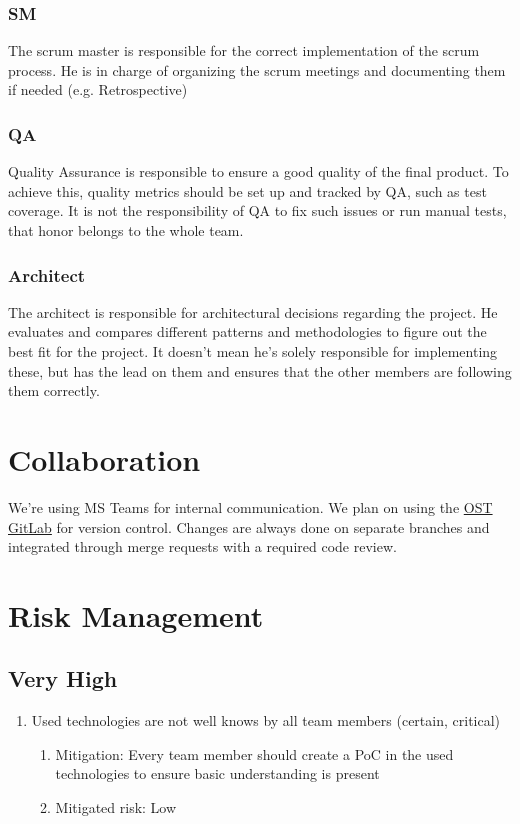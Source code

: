 \subsubsection*{SM}
The scrum master is responsible for the correct implementation of the scrum process.
He is in charge of organizing the scrum meetings and documenting them if needed (e.g. Retrospective)

\subsubsection*{QA}
Quality Assurance is responsible to ensure a good quality of the final product.
To achieve this, quality metrics should be set up and tracked by QA, such as test coverage.
It is not the responsibility of QA to fix such issues or run manual tests, that honor belongs to the whole team.

\subsubsection*{Architect}
The architect is responsible for architectural decisions regarding the project.
He evaluates and compares different patterns and methodologies to figure out the best fit for the project.
It doesn't mean he's solely responsible for implementing these, but has the lead on them and ensures that the other members are following them correctly.

\section{Collaboration}

We're using MS Teams for internal communication.
We plan on using the \href{https://gitlab.ost.ch/SEProj/2022-FS/g02-jasstracker/jasstracker}{OST GitLab} for version control.
Changes are always done on separate branches and integrated through merge requests with a required code review.

\section{Risk Management}

\subsection{Very High}
\begin{enumerate}
    \item Used technologies are not well knows by all team members (certain, critical) 
    \begin{enumerate}
        \item Mitigation: Every team member should create a PoC in the used technologies to ensure basic understanding is present
        \item Mitigated risk: Low
    \end{enumerate}
\end{enumerate}

